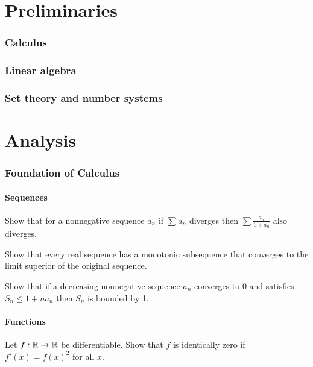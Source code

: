 \documentclass[12pt]{article}
\begin{document}
\tableofcontents

\newpage
\part*{Preliminaries}
\section{Calculus}
\section{Linear algebra}
\section{Set theory and number systems}




\newpage
\part{Analysis}
\setcounter{section}{0}

\section{Foundation of Calculus}
	\subsection{Sequences}
	\begin{prb}
	Show that for a nonnegative sequence $a_n$ if $\sum a_n$ diverges then $\sum\frac{a_n}{1+a_n}$ also diverges.
	\end{prb}

	\begin{prb}
	Show that every real sequence has a monotonic subsequence that converges to the limit superior of the original sequence.
	\end{prb}

	\begin{prb}
	Show that if a decreasing nonnegative sequence $a_n$ converges to 0 and satisfies $S_n\le1+na_n$ then $S_n$ is bounded by 1.
	\end{prb}

	\subsection{Functions}
	\begin{prb}
	Let $f:\mathbb{R}\to\mathbb{R}$ be differentiable.
	Show that $f$ is identically zero if $f'(x)=f(x)^2$ for all $x$.
	\end{prb}
\end{document}
